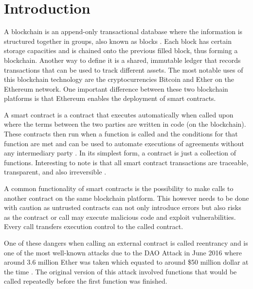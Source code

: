 \documentclass[10pt,conference]{IEEEtran}
\begin{document}
\section{Introduction}

A blockchain is an append-only transactional database where the information is structured together in groups, also known as blocks \cite{smart_inspect, smarter}. Each block has certain storage capacities and is chained onto the previous filled block, thus forming a blockchain. Another way to define it is a shared, immutable ledger that records transactions that can be used to track different assets. The most notable uses of this blockchain technology are the cryptocurrencies Bitcoin\cite{article} and Ether \cite{ethereum, white_paper} on the Ethereum network. One important difference between these two blockchain platforms is that Ethereum enables the deployment of smart contracts.

A smart contract is a contract that executes automatically when called upon where the terms between the two parties are written in code (on the blockchain). These contracts then run when a function is called and the conditions for that function are met and can be used to automate executions of agreements without any intermediary party \cite{criminal, 10.1145/2993600.2993611, smarter}. In its simplest form, a contract is just a collection of functions. Interesting to note is that all smart contract transactions are traceable, transparent, and also irreversible \cite{smart_inspect, smarter}.

A common functionality of smart contracts is the possibility to make calls to another contract on the same blockchain platform. This however needs to be done with caution as untrusted contracts can not only introduce errors but also risks as the contract or call may execute malicious code and exploit vulnerabilities. Every call transfers execution control to the called contract.

One of these dangers when calling an external contract is called reentrancy and is one of the most well-known attacks due to the DAO Attack in June 2016 where around 3.6 million Ether was taken which equated to around \$50 million dollar at the time \cite{10.1007/978-3-662-54455-6_8}. %
The original version of this attack involved functions that would be called repeatedly before the first function was finished.
\end{document}
